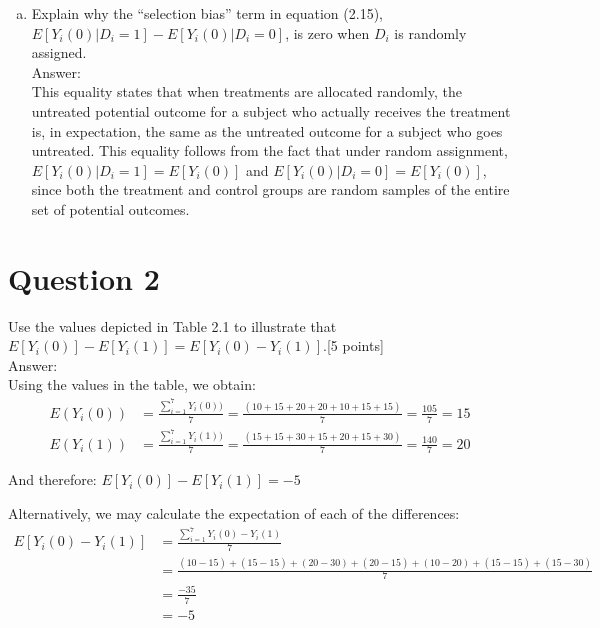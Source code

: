 \documentclass[11pt,notitlepage]{article}		%
\begin{document}
\begin{enumerate}[a)]
\item Explain why the ``selection bias'' term in equation (2.15), $E[Y_{i}(0)|D_{i}=1]-E[Y_{i}(0)|D_{i}=0]$, is zero when $D_{i}$ is randomly assigned. \\
Answer:\\
This equality states that when treatments are allocated randomly, the untreated potential outcome for a subject who actually receives the treatment is, in expectation, the same as the untreated outcome for a subject who goes untreated.  This equality follows from the fact that under random assignment, $E[Y_{i}(0)|D_{i}=1]=E[Y_{i}(0)]$ and $E[Y_{i}(0)|D_{i}=0]=E[Y_{i}(0)]$, since both the treatment and control groups are random samples of the entire set of potential outcomes.

\end{enumerate}

\section*{Question 2}
Use the values depicted in Table 2.1 to illustrate that $E[Y_{i}(0)] - E[Y_{i}(1)] = E[Y_{i}(0)-Y_{i}(1)]$.[5 points]\\
Answer:\\
Using the values in the table, we obtain: 
\begin{align*}
E(Y_{i}(0))&=\frac{\sum_{i=1}^7 Y_{i}(0))}{7} = \frac{(10+15+20+20+10+15+15)}{7} =\frac{105}{7	} = 15 \\
E(Y_{i}(1))&=\frac{\sum_{i=1}^7 Y_{i}(1))}{7} = \frac{(15+15+30+15+20+15+30)}{7} =\frac{140}{7	} = 20
\end{align*}

And therefore: $E[Y_{i}(0)]-E[Y_{i}(1)]=-5$

Alternatively, we may calculate the expectation of each of the differences: 
\begin{align*}
E[Y_{i}(0)-Y_{i}(1)] &= \frac{\sum_{i=1}^7 Y_{i}(0)-Y_{i}(1)}{7}\\
&= \frac{(10-15)+(15-15)+(20-30)+(20-15)+(10-20)+(15-15)+(15-30)}{7}\\
&= \frac{-35}{7}\\
&= -5
\end{align*}

\end{document}

